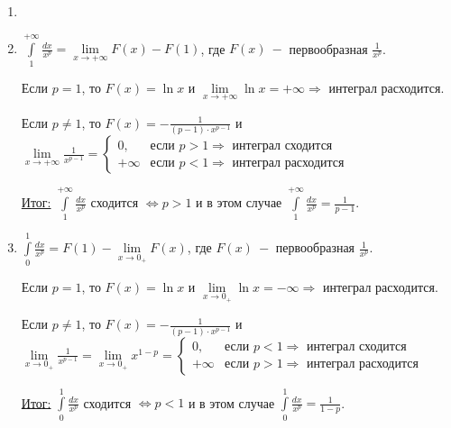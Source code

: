 \begin{example}
    \begin{enumerate}
        \item[]
        \item $\int\limits_1^{+\infty }\frac{dx}{x^p}=\lim\limits_{x\rightarrow +\infty}F(x)-F(1)$, где $F(x)\ -$ первообразная $\frac{1}{x^p}$.

        Если $p=1$, то $F(x)=\ln x$ и $\lim\limits_{x\rightarrow +\infty}\ln x=+\infty\Rightarrow$ интеграл расходится.

        Если $p\neq1$, то $F(x)=-\frac{1}{(p-1)\cdot x^{p-1}}$ и $\lim\limits_{x\rightarrow +\infty}\frac{1}{x^{p-1}}=\begin{cases}
                                                                                                                          0, & \text{если $p>1\Rightarrow$ интеграл сходится} \\
                                                                                                                          +\infty & \text{если $p<1\Rightarrow$ интеграл расходится}
        \end{cases}$

        \underline{Итог:} $\int\limits_1^{+\infty }\frac{dx}{x^p}$ сходится $\Leftrightarrow p>1$ и в этом случае $\int\limits_1^{+\infty }\frac{dx}{x^p}=\frac{1}{p-1}$.
        \item $\int\limits_0^1\frac{dx}{x^p}=F(1)-\lim\limits_{x\rightarrow 0_+}F(x)$, где $F(x)\ -$ первообразная $\frac{1}{x^p}$.

        Если $p=1$, то $F(x)=\ln x$ и $\lim\limits_{x\rightarrow 0_+}\ln x=-\infty\Rightarrow$ интеграл расходится.

        Если $p\neq1$, то $F(x)=-\frac{1}{(p-1)\cdot x^{p-1}}$ и $\lim\limits_{x\rightarrow 0_+}\frac{1}{x^{p-1}}=\lim\limits_{x\rightarrow 0_+}x^{1-p}=\begin{cases}
                                                                                                                                                            0, & \text{если $p<1\Rightarrow$ интеграл сходится} \\
                                                                                                                                                            +\infty & \text{если $p>1\Rightarrow$ интеграл расходится}
        \end{cases}$

        \underline{Итог:} $\int\limits_0^1\frac{dx}{x^p}$ сходится $\Leftrightarrow p<1$ и в этом случае $\int\limits_0^1\frac{dx}{x^p}=\frac{1}{1-p}$.
    \end{enumerate}
\end{example}

